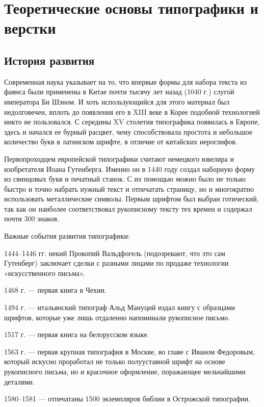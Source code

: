 \section{Теоретические основы типографики и верстки}

\subsection{История развития}

Современная наука указывает на то, что впервые формы для набора текста из фаянса были применены в Китае почти тысячу лет назад (1040 г.) слугой императора Би Шэном. И хоть использующийся для этого материал был недолговечен, вплоть до появления его в XIII веке в Корее подобной технологией никто не пользовался. С середины XV столетия типографика появилась в Европе, здесь и начался ее бурный расцвет, чему способствовала простота и небольшое количество букв в латинском шрифте, в отличие от китайских иероглифов\cite{typo_history}.

Первопроходцем европейской типографики считают немецкого ювелира и изобретателя Иоана Гутенберга. Именно он в 1440 году создал наборную форму из свинцовых букв и печатный станок. С их помощью можно было не только быстро и точно набрать нужный текст и отпечатать страницу, но и многократно использовать металлические символы. Первым шрифтом был выбран готический, так как он наиболее соответствовал рукописному тексту тех времен и содержал почти 300 знаков.

Важные события развития типографики:

\begin{itemize*}
	\item 1444--1446 гг. некий Прокопий Вальдфогель (подозревают, что это сам Гутенберг) заключает сделки с разными лицами по продаже технологии «искусственного письма».
	\item 1468 г. --- первая книга в Чехии.
	\item 1494 г. --- итальянский типограф Альд Мануций издал книгу с образцами шрифтов, которые уже лишь отдаленно напоминали рукописное письмо.
	\item 1517 г. --- первая книга на белорусском языке.
	\item 1563 г. --- первая крупная типография в Москве, во главе с Иваном Федоровым, который искусно проработал не только полууставной шрифт на основе рукописного письма, но и красочное оформление, поражающее мельчайшими деталями.
	\item 1580--1581 --- отпечатаны 1500 экземпляров библии в Острожской типографии.
\end{itemize*}

